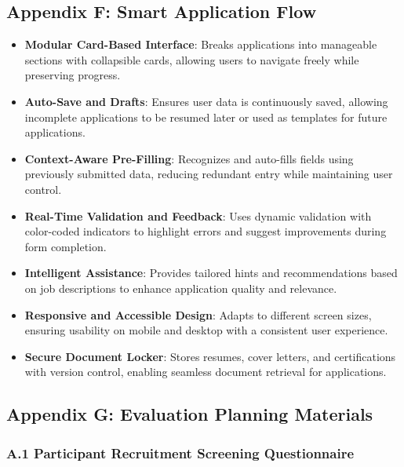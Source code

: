 \documentclass[
	letterpaper, %
]{jdf}
\begin{document}
\subsection{Appendix F: Smart Application Flow}
\begin{itemize}
    \item \textbf{Modular Card-Based Interface}: Breaks applications into manageable sections with collapsible cards, allowing users to navigate freely while preserving progress.
    \item \textbf{Auto-Save and Drafts}: Ensures user data is continuously saved, allowing incomplete applications to be resumed later or used as templates for future applications.
    \item \textbf{Context-Aware Pre-Filling}: Recognizes and auto-fills fields using previously submitted data, reducing redundant entry while maintaining user control.
    \item \textbf{Real-Time Validation and Feedback}: Uses dynamic validation with color-coded indicators to highlight errors and suggest improvements during form completion.
    \item \textbf{Intelligent Assistance}: Provides tailored hints and recommendations based on job descriptions to enhance application quality and relevance.
    \item \textbf{Responsive and Accessible Design}: Adapts to different screen sizes, ensuring usability on mobile and desktop with a consistent user experience.
    \item \textbf{Secure Document Locker}: Stores resumes, cover letters, and certifications with version control, enabling seamless document retrieval for applications.
\end{itemize}

\subsection{Appendix G: Evaluation Planning Materials}

\subsubsection{A.1 Participant Recruitment Screening Questionnaire}
\end{document}
